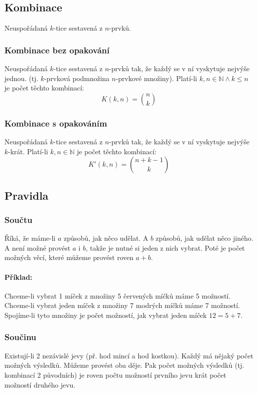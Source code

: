 \documentclass[12pt]{article}
\begin{document}
\subsection{Kombinace}
Neuspořádaná $k$-tice sestavená z $n$-prvků.
\subsubsection{Kombinace bez opakování}
\label{sec:kombinace-bez}
Neuspořádaná $k$-tice sestavená z $n$-prvků tak, že každý se v ní vyskytuje nejvýše jednou. (tj. $k$-prvková podmnožina $n$-prvkové množiny). Platí-li $k,n \in \mathbb{N} \land k \leq n$ je počet těchto kombinací:
\begin{equation}
K\left(k,n\right) = \binom{n}{k}
\end{equation} 
\subsubsection{Kombinace s opakováním}
Neuspořádaná $k$-tice sestavená z $n$-prvků tak, že každý se v ní vyskytuje nejvýše $k$-krát. Platí-li $k,n \in \mathbb{N}$ je počet těchto kombinací:
\begin{equation}
K' \left(k,n\right) = \binom{n+k-1}{k}
\end{equation}

\subsection{Pravidla}
\subsubsection{Součtu}
Říká, že máme-li $a$ způsobů, jak něco udělat. A $b$ způsobů, jak udělat něco jiného. A není možné provést $a$ i $b$, takže je nutné si jeden z nich vybrat. Poté je počet možných věcí, které můžeme provést roven $a+b$.  
\paragraph{Příklad: }Chceme-li vybrat 1 míček z množiny 5 červených míčků máme 5 možností. Chceme-li vybrat jeden míček z množiny 7 modrých míčků máme 7 možností. Spojíme-li tyto množiny je počet možností, jak vybrat jeden míček $12=5+7$.
\subsubsection{Součinu}
\label{sec:pravidlo_soucinu}
Existují-li 2 nezávislé jevy (př. hod mincí a hod kostkou). Každý má nějaký počet možných výsledků. Můžeme provést oba děje. Pak počet možných výsledků (tj. kombinací 2 původních) je roven počtu možností prvního jevu krát počet možností druhého jevu.
\end{document}

